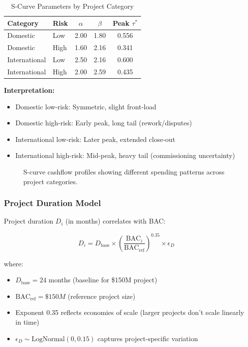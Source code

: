 \begin{table}[h]
\centering
\small
\caption{S-Curve Parameters by Project Category}
\label{tab:scurve_params}
\begin{tabular}{@{}llccc@{}}
\toprule
Category & Risk & $\alpha$ & $\beta$ & Peak $\tau^*$ \\
\midrule
Domestic & Low & 2.00 & 1.80 & 0.556 \\
Domestic & High & 1.60 & 2.16 & 0.341 \\
International & Low & 2.50 & 2.16 & 0.600 \\
International & High & 2.00 & 2.59 & 0.435 \\
\bottomrule
\end{tabular}
\end{table}

\textbf{Interpretation:}
\begin{itemize}
    \item Domestic low-risk: Symmetric, slight front-load
    \item Domestic high-risk: Early peak, long tail (rework/disputes)
    \item International low-risk: Later peak, extended close-out
    \item International high-risk: Mid-peak, heavy tail (commissioning uncertainty)
\end{itemize}

\begin{figure}[h]
\centering
\resizebox{\columnwidth}{!}{}
\caption{S-curve cashflow profiles showing different spending patterns across project categories.}
\label{fig:scurve_profiles}
\end{figure}

\subsubsection{Project Duration Model}

Project duration $D_i$ (in months) correlates with BAC:

\begin{equation}
D_i = D_{\text{base}} \times \left(\frac{\text{BAC}_i}{\text{BAC}_{\text{ref}}}\right)^{0.35} \times \epsilon_D
\end{equation}

where:
\begin{itemize}
    \item $D_{\text{base}} = 24$ months (baseline for \$150M project)
    \item $\text{BAC}_{\text{ref}} = \$150M$ (reference project size)
    \item Exponent 0.35 reflects economies of scale (larger projects don't scale linearly in time)
    \item $\epsilon_D \sim \text{LogNormal}(0, 0.15)$ captures project-specific variation
\end{itemize}

